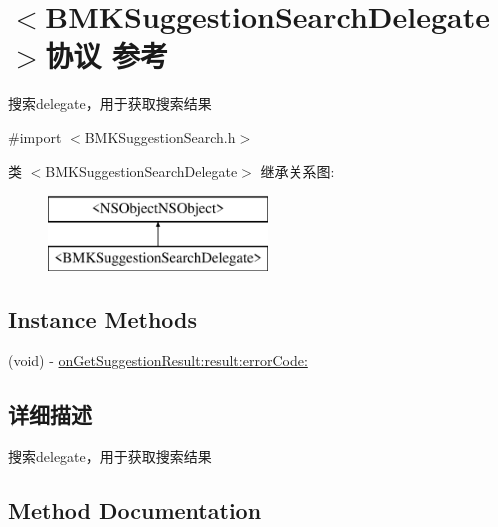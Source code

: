 \hypertarget{protocol_b_m_k_suggestion_search_delegate-p}{}\section{$<$B\+M\+K\+Suggestion\+Search\+Delegate$>$协议 参考}
\label{protocol_b_m_k_suggestion_search_delegate-p}


搜索delegate，用于获取搜索结果  




{\ttfamily \#import $<$B\+M\+K\+Suggestion\+Search.\+h$>$}

类 $<$B\+M\+K\+Suggestion\+Search\+Delegate$>$ 继承关系图\+:\begin{figure}[H]
\begin{center}
\leavevmode
\includegraphics[height=2.000000cm]{protocol_b_m_k_suggestion_search_delegate-p}
\end{center}
\end{figure}
\subsection*{Instance Methods}
\begin{DoxyCompactItemize}
\item 
(void) -\/ \hyperlink{protocol_b_m_k_suggestion_search_delegate-p_ac775c91f8fa313629246bbeafcf98eba}{on\+Get\+Suggestion\+Result\+:result\+:error\+Code\+:}
\end{DoxyCompactItemize}


\subsection{详细描述}
搜索delegate，用于获取搜索结果 

\subsection{Method Documentation}
\hypertarget{protocol_b_m_k_suggestion_search_delegate-p_ac775c91f8fa313629246bbeafcf98eba}{}
